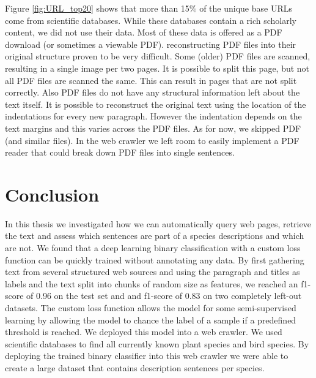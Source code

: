 \documentclass[a4paper, 12pt, oneside]{book} %
\begin{document}
Figure \ref{fig:URL_top20} shows that more than 15\% of the unique base URLs come from scientific databases.
While these databases contain a rich scholarly content, we did not use their data.
Most of these data is offered as a PDF download (or sometimes a viewable PDF).
reconstructing PDF files into their original structure proven to be very difficult.
Some (older) PDF files are scanned, resulting in a single image per two pages. 
It is possible to split this page, but not all PDF files are scanned the same. 
This can result in pages that are not split correctly.
Also PDF files do not have any structural information left about the text itself. 
It is possible to reconstruct the original text using the location of the indentations for every new paragraph.
However the indentation depends on the text margins and this varies across the PDF files.
As for now, we skipped PDF (and similar files). 
In the web crawler we left room to easily implement a PDF reader that could break down PDF files into single sentences.



\newpage
\section{Conclusion} \label{par:conclusion}
In this thesis we investigated how we can automatically query web pages, retrieve the text and assess which sentences are part of a species descriptions and which are not.
We found that a deep learning binary classification with a custom loss function can be quickly trained without annotating any data.
By first gathering text from several structured web sources and using the paragraph and titles as labels and the text split into chunks of random size as features, we reached an f1-score of 0.96 on the test set and and f1-score of 0.83 on two completely left-out datasets.
The custom loss function allows the model for some semi-supervised learning by allowing the model to chance the label of a sample if a predefined threshold is reached.
We deployed this model into a web crawler.
We used scientific databases to find all currently known plant species and bird species.
By deploying the trained binary classifier into this web crawler we were able to create a large dataset that contains description sentences per species.



\newpage
\end{document}
